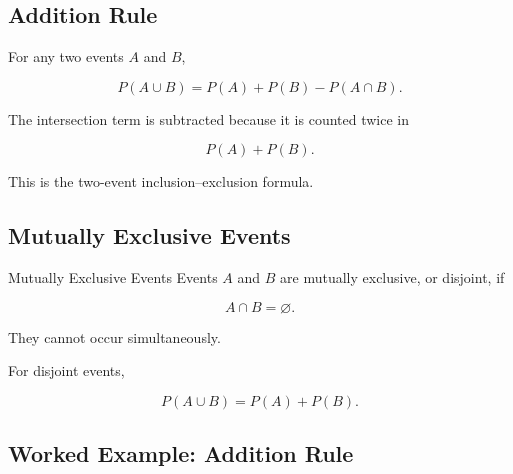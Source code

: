 \subsection{Addition Rule}
\label{subsec:addition-rule-probability}

For any two events \(A\) and \(B\),

\[
\boxed{
P(A\cup B)
=
P(A)+P(B)-P(A\cap B).
}
\]

The intersection term is subtracted because it is counted twice in

\[
P(A)+P(B).
\]

This is the two-event inclusion--exclusion formula.

\subsection{Mutually Exclusive Events}
\label{subsec:mutually-exclusive-events}

\begin{definitionbox}{Mutually Exclusive Events}
Events \(A\) and \(B\) are mutually exclusive, or disjoint, if

\[
\boxed{
A\cap B=\varnothing.
}
\]
\end{definitionbox}

They cannot occur simultaneously.

For disjoint events,

\[
\boxed{
P(A\cup B)
=
P(A)+P(B).
}
\]

\subsection{Worked Example: Addition Rule}
\label{subsec:worked-addition-rule}

